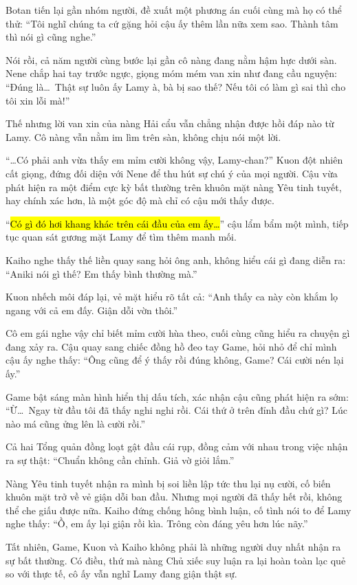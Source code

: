 \documentclass[../main.tex]{subfiles}
\begin{document}
Botan tiến lại gần nhóm người, đề xuất một phương án cuối cùng mà họ có thể thử: ``Tôi nghĩ chúng ta cứ gặng hỏi cậu ấy thêm lần nữa xem sao. Thành tâm thì nói gì cũng nghe.''

Nói rồi, cả năm người cùng bước lại gần cô nàng đang nằm hậm hực dưới sàn. Nene chắp hai tay trước ngực, giọng móm mém van xin như đang cầu nguyện: ``Đúng là\dots\ Thật sự luôn ấy Lamy à, bà bị sao thế? Nếu tôi có làm gì sai thì cho tôi xin lỗi mà!''

Thế nhưng lời van xin của nàng Hải cẩu vẫn chẳng nhận được hồi đáp nào từ Lamy. Cô nàng vẫn nằm im lìm trên sàn, không chịu nói một lời.

``\dots Có phải anh vừa thấy em mỉm cười không vậy, Lamy-chan?'' Kuon đột nhiên cất giọng, đứng đối diện với Nene để thu hút sự chú ý của mọi người. Cậu vừa phát hiện ra một điểm cực kỳ bất thường trên khuôn mặt nàng Yêu tinh tuyết, hay chính xác hơn, là một góc độ mà chỉ có cậu mới thấy được.

``\hl{Có gì đó hơi khang khác trên cái đầu của em ấy\dots}'' cậu lẩm bẩm một mình, tiếp tục quan sát gương mặt Lamy để tìm thêm manh mối.

Kaiho nghe thấy thế liền quay sang hỏi ông anh, không hiểu cái gì đang diễn ra: ``Aniki nói gì thế? Em thấy bình thường mà.''

Kuon nhếch môi đáp lại, vẻ mặt hiểu rõ tất cả: ``Anh thấy ca này còn khắm lọ ngang với cả em đấy. Giận dỗi vờn thôi.''

Cô em gái nghe vậy chỉ biết mỉm cười hùa theo, cuối cùng cũng hiểu ra chuyện gì đang xảy ra. Cậu quay sang chiếc đồng hồ đeo tay Game, hỏi nhỏ để chỉ mình cậu ấy nghe thấy: ``Ông cũng để ý thấy rồi đúng không, Game? Cái cười nén lại ấy.''

Game bật sáng màn hình hiển thị dấu tích, xác nhận cậu cũng phát hiện ra sớm: ``Ừ\dots\ Ngay từ đầu tôi đã thấy nghi nghi rồi. Cái thứ ở trên đỉnh đầu chứ gì? Lúc nào má cũng ửng lên là cười rồi.''

Cả hai Tổng quản đồng loạt gật đầu cái rụp, đồng cảm với nhau trong việc nhận ra sự thật: ``Chuẩn không cần chỉnh. Giả vờ giỏi lắm.''

Nàng Yêu tinh tuyết nhận ra mình bị soi liền lập tức thu lại nụ cười, cố biến khuôn mặt trở về vẻ giận dỗi ban đầu. Nhưng mọi người đã thấy hết rồi, không thể che giấu được nữa. Kaiho đứng chống hông bình luận, cố tình nói to để Lamy nghe thấy: ``Ồ, em ấy lại giận rồi kìa. Trông còn đáng yêu hơn lúc nãy.''

Tất nhiên, Game, Kuon và Kaiho không phải là những người duy nhất nhận ra sự bất thường. Có điều, thứ mà nàng Chủ xiếc suy luận ra lại hoàn toàn lạc quẻ so với thực tế, cô ấy vẫn nghĩ Lamy đang giận thật sự.
\end{document}
